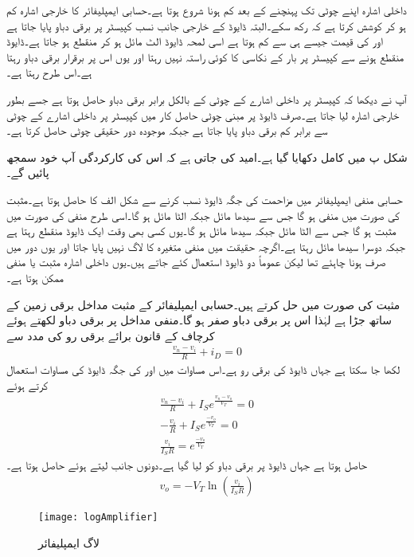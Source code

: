 داخلی اشارہ اپنے چوٹی تک پہنچنے کے بعد کم ہونا شروع ہوتا ہے۔حسابی ایمپلیفائر کا خارجی اشارہ  کم ہو کر کوشش کرتا ہے کہ  رکھ سکے۔البتہ ڈایوڈ کے خارجی جانب نسب کپیسٹر پر  برقی دباو پایا جاتا ہے اور  کی قیمت جیسے ہی  سے کم ہوتا ہے اسی لمحہ ڈایوڈ الٹ مائل ہو کر منقطع ہو جاتا ہے۔ڈایوڈ منقطع ہونے سے کپیسٹر پر بار کے نکاسی  کا کوئی راستہ نہیں رہتا اور یوں اس پر برقرار  برقی دباو رہتا ہے۔اس طرح  رہتا ہے۔ 

آپ نے دیکھا کہ کپیسٹر پر داخلی اشارے کے چوٹی کے بالکل برابر برقی دباو حاصل ہوتا ہے جسے بطور خارجی اشارہ  لیا جاتا ہے۔صرف ڈایوڈ پر مبنی چوٹی حاصل کار میں کپیسٹر پر داخلی اشارے کے چوٹی سے  برابر کم برقی دباو پایا جاتا ہے جبکہ موجودہ دور حقیقی چوٹی حاصل کرتا ہے۔

شکل  پ میں کامل  دکھایا گیا ہے۔امید کی جاتی ہے کہ اس کی کارکردگی  آپ خود سمجھ پائیں گے۔

حسابی منفی ایمپلیفائر میں مزاحمت کی جگہ ڈایوڈ نسب کرنے سے شکل  الف کا  حاصل ہوتا ہے۔مثبت  کی صورت میں  منفی ہو گا جس سے  سیدھا مائل جبکہ  الٹا مائل ہو گا۔اسی طرح منفی   کی صورت میں  مثبت ہو گا جس سے  الٹا مائل جبکہ  سیدھا مائل ہو گا۔یوں کسی بھی وقت ایک ڈایوڈ منقطع رہتا ہے جبکہ دوسرا سیدھا مائل رہتا ہے۔اگرچہ حقیقت میں منفی متغیرہ کا لاگ نہیں پایا جاتا اور یوں دور میں صرف  ہونا چاہئے تھا لیکن عموماً دو ڈایوڈ استعمال کئے جاتے ہیں۔یوں داخلی اشارہ  مثبت یا منفی ممکن ہوتا ہے۔

مثبت  کی صورت میں حل کرتے ہیں۔حسابی ایمپلیفائر کے مثبت مداخل برقی زمین کے ساتھ جڑا ہے لہٰذا اس پر برقی دباو  صفر ہو گا۔منفی مداخل پر برقی دباو  لکھتے ہوئے کرچاف کے قانون برائے برقی رو کی مدد سے
\begin{align*}
\frac{v_n-v_i}{R}+i_D=0
\end{align*}
لکھا جا سکتا ہے جہاں  ڈایوڈ  کی برقی رو ہے۔اس مساوات میں   اور  کی جگہ ڈایوڈ کی مساوات استعمال کرتے ہوئے 
\begin{align*}
\frac{v_n-v_i}{R}+I_S e^{\frac{v_n-v_o}{V_T}}=0\\
-\frac{v_i}{R}+I_S e^{\frac{-v_o}{V_T}}=0\\
\frac{v_i}{I_S R}= e^{\frac{-v_o}{V_T}}
\end{align*}
حاصل ہوتا ہے جہاں ڈایوڈ پر برقی دباو کو  لیا گیا ہے۔دونوں جانب  لیتے ہوئے حاصل ہوتا ہے۔
\begin{align*}
v_o=-V_T \ln {\left( \frac{v_i}{I_S R} \right)}
\end{align*}
%
\begin{figure}
\centering
\texttt{[image: logAmplifier]}
\caption{لاگ ایمپلیفائر}
\label{شکل_ڈایوڈ_لاگ_ایمپلیفائر}
\end{figure}

